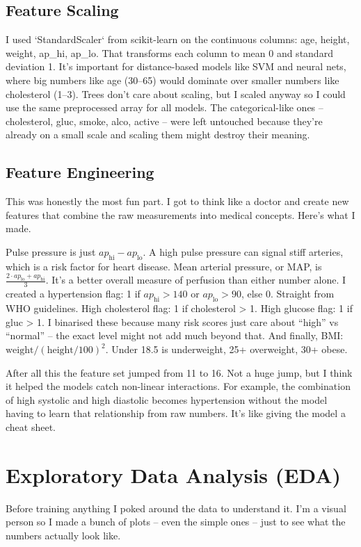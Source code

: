 \documentclass[12pt, a4paper, oneside]{book}
\begin{document}
\subsection{Feature Scaling}
I used `StandardScaler` from scikit-learn on the continuous columns: age, height, weight, ap\_hi, ap\_lo. That transforms each column to mean 0 and standard deviation 1. It's important for distance-based models like SVM and neural nets, where big numbers like age (30--65) would dominate over smaller numbers like cholesterol (1--3). Trees don't care about scaling, but I scaled anyway so I could use the same preprocessed array for all models. The categorical-like ones -- cholesterol, gluc, smoke, alco, active -- were left untouched because they're already on a small scale and scaling them might destroy their meaning.

\subsection{Feature Engineering}
This was honestly the most fun part. I got to think like a doctor and create new features that combine the raw measurements into medical concepts. Here's what I made.

Pulse pressure is just $ap_{\text{hi}} - ap_{\text{lo}}$. A high pulse pressure can signal stiff arteries, which is a risk factor for heart disease. Mean arterial pressure, or MAP, is $\frac{2 \cdot ap_{\text{lo}} + ap_{\text{hi}}}{3}$. It's a better overall measure of perfusion than either number alone. I created a hypertension flag: 1 if $ap_{\text{hi}} > 140$ or $ap_{\text{lo}} > 90$, else 0. Straight from WHO guidelines. High cholesterol flag: 1 if cholesterol > 1. High glucose flag: 1 if gluc > 1. I binarised these because many risk scores just care about ``high'' vs ``normal'' -- the exact level might not add much beyond that. And finally, BMI: $\text{weight} / (\text{height}/100)^2$. Under 18.5 is underweight, 25+ overweight, 30+ obese.

After all this the feature set jumped from 11 to 16. Not a huge jump, but I think it helped the models catch non-linear interactions. For example, the combination of high systolic and high diastolic becomes hypertension without the model having to learn that relationship from raw numbers. It's like giving the model a cheat sheet.

\section{Exploratory Data Analysis (EDA)}
Before training anything I poked around the data to understand it. I'm a visual person so I made a bunch of plots -- even the simple ones -- just to see what the numbers actually look like.
\end{document}
